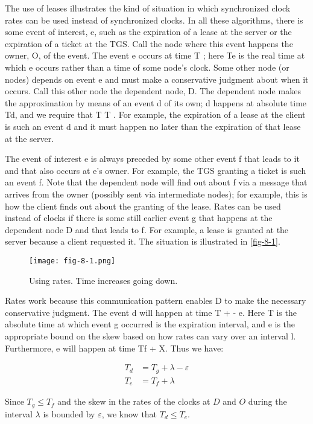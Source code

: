 \documentclass[a4paper,11pt,notitlepage,twoside,openright]{article}
\begin{document}
The use of leases illustrates the kind of situation in which
synchronized clock rates can be used instead of synchronized clocks. In
all these algorithms, there is some event of interest, e, such as the
expiration of a lease at the server or the expiration of a ticket at the
TGS. Call the node where this event happens the owner, O, of the event.
The event e occurs at time T ; here Te is the real time at which e
occurs rather than a time of some node's clock. Some other node (or
nodes) depends on event e and must make a conservative judgment about
when it occurs. Call this other node the dependent node, D. The
dependent node makes the approximation by means of an event d of its
own; d happens at absolute time Td, and we require that T T . For
example, the expiration of a lease at the client is such an event d and
it must happen no later than the expiration of that lease at the server.

The event of interest e is always preceded by some other event f that
leads to it and that also occurs at e's owner. For example, the TGS
granting a ticket is such an event f. Note that the dependent node will
find out about f via a message that arrives from the owner (possibly
sent via intermediate nodes); for example, this is how the client finds
out about the granting of the lease. Rates can be used instead of clocks
if there is some still earlier event g that happens at the dependent
node D and that leads to f. For example, a lease is granted at the
server because a client requested it. The situation is illustrated in
\autoref{fig-8-1}.

\begin{figure}
  \centering
  \texttt{[image: fig-8-1.png]}
  \caption{Using rates. Time increases going down.\label{fig-8-1}}
\end{figure}


Rates work because this communication pattern enables D to make the
necessary conservative judgment. The event d will happen at time T + -
e. Here T is the absolute time at which event g occurred is the
expiration interval, and e is the appropriate bound on the skew based on
how rates can vary over an interval l. Furthermore, e will happen at
time Tf + X. Thus we have:

\begin{align*}
  T_d &= T_g + \lambda - \varepsilon\\
  T_e &= T_f + \lambda
\end{align*}

Since $T_g \leq T_f$ and the skew in the rates of the clocks at $D$ and $O$ during the
interval $\lambda$ is bounded by $\varepsilon$, we know that $T_d \leq T_e$.
\end{document}
